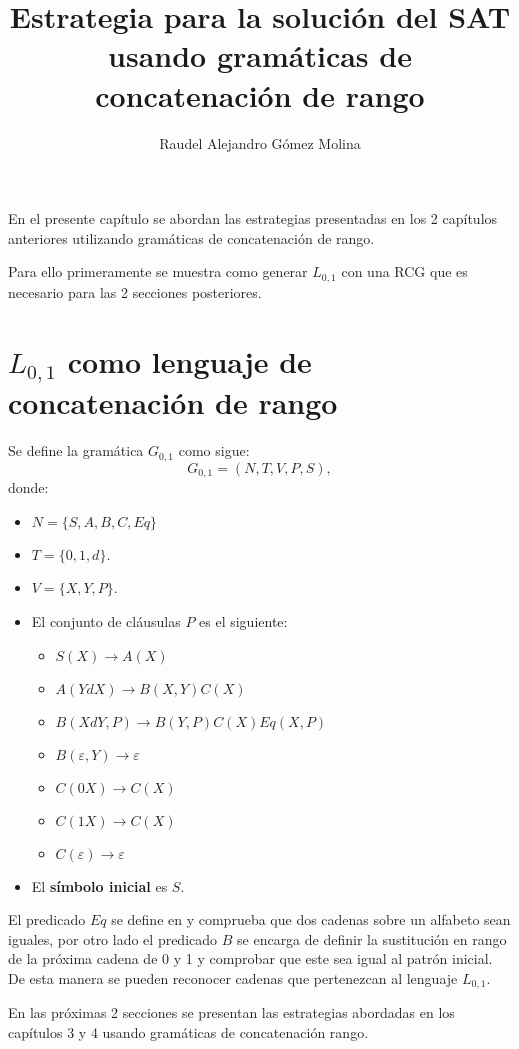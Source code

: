 \documentclass[12pt]{article}
\title{Estrategia para la solución del SAT usando gramáticas de concatenación de rango}
\author{Raudel Alejandro Gómez Molina}
\begin{document}
\maketitle

En el presente capítulo se abordan las estrategias presentadas en los 2 capítulos anteriores utilizando gramáticas de concatenación
de rango.

Para ello primeramente se muestra como generar $L_{0,1}$ con una RCG que es necesario para las 2 secciones posteriores.

\section{$L_{0,1}$ como lenguaje de concatenación de rango}

Se define la gramática $G_{0,1}$ como sigue:
\[
    G_{0,1} = (N, T, V, P, S),
\]
donde:

\begin{itemize}
    \item $N=\{S,A,B,C,Eq\}$
    \item $T=\{0,1,d\}$.
    \item $V=\{X,Y,P\}$.
    \item El conjunto de cláusulas $P$ es el siguiente:
          \begin{itemize}
              \item  $S(X)\to A(X)$
              \item $A(YdX)\to B(X,Y)C(X)$
              \item $B(XdY,P)\to B(Y,P) C(X) Eq(X,P)$
              \item $B(\varepsilon,Y)\to \varepsilon$
              \item $C(0X)\to C(X)$
              \item $C(1X)\to C(X)$
              \item $C(\varepsilon)\to \varepsilon$
          \end{itemize}
    \item El \textbf{símbolo inicial} es $S$.
\end{itemize}

El predicado $Eq$ se define en \cite{mainRCGBib} y comprueba que dos cadenas sobre un alfabeto sean iguales,
por otro lado el predicado $B$ se encarga de definir la sustitución en rango de la próxima cadena de 0 y 1 y
comprobar que este sea igual al patrón inicial. De esta manera se pueden reconocer cadenas que pertenezcan al lenguaje $L_{0,1}$.

En las próximas 2 secciones se presentan las estrategias abordadas en los capítulos 3 y 4 usando gramáticas de concatenación
rango.
\end{document}
